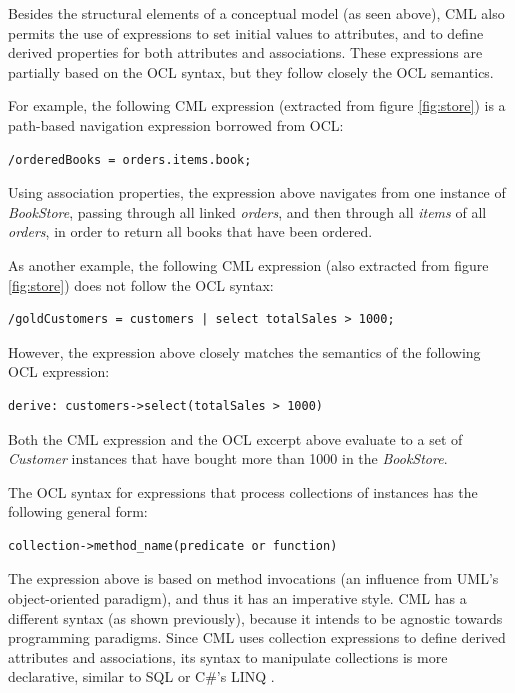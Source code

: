 Besides the structural elements of a conceptual model (as seen above),
CML also permits the use of expressions to set initial values to attributes,
and to define derived properties for both attributes and associations.
These expressions are partially based on the OCL \cite{ocl} syntax,
but they follow closely the OCL semantics.

For example, the following CML expression (extracted from figure \ref{fig:store}) is a path-based navigation expression borrowed from OCL:

\verbatimfont{\scriptsize}
\begin{verbatim}
/orderedBooks = orders.items.book;
\end{verbatim}

Using association properties, the expression above navigates from one instance of \emph{BookStore}, passing through all linked \emph{orders}, and then through all \emph{items} of all \emph{orders}, in order to return all books that have been ordered. 

As another example,
the following CML expression (also extracted from figure \ref{fig:store}) does not follow the OCL syntax:

\verbatimfont{\scriptsize}
\begin{verbatim}
/goldCustomers = customers | select totalSales > 1000;
\end{verbatim}

However, the expression above closely matches the semantics of the following OCL expression:

\verbatimfont{\scriptsize}
\begin{verbatim}
derive: customers->select(totalSales > 1000)
\end{verbatim}

Both the CML expression and the OCL excerpt above evaluate to a set of \emph{Customer} instances
that have bought more than 1000 in the \emph{BookStore}. 

The OCL syntax for expressions that process collections of instances has the following general form:

\verbatimfont{\scriptsize}
\begin{verbatim}
collection->method_name(predicate or function)
\end{verbatim}

The expression above is based on method invocations
(an influence from UML's object-oriented paradigm),
and thus it has an imperative style. CML has a different syntax (as shown previously),
because it intends to be agnostic towards programming paradigms.
Since CML uses collection expressions to define derived attributes and associations,
its syntax to manipulate collections is more declarative,
similar to SQL \cite{sql} or C\#'s LINQ \cite{torgersen}.
 
